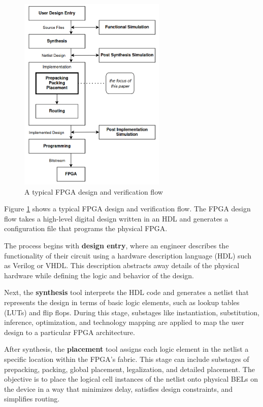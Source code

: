 \documentclass[twocolumn]{article}
\begin{document}
    \begin{figure}
        \centering
        \includegraphics[width=7.0cm]{figures/design_flow.png}
        \caption{A typical FPGA design and verification flow}
        \label{fig:design_flow}
    \end{figure}

    Figure \ref{fig:design_flow} shows a typical FPGA design and verification flow.
    The FPGA design flow takes a high-level digital design written in an HDL and generates a configuration file that programs the physical FPGA. 

    The process begins with \textbf{design entry}, where an engineer describes the functionality of their circuit using a hardware description language (HDL) such as Verilog or VHDL. This description abstracts away details of the physical hardware while defining the logic and behavior of the design.

    Next, the \textbf{synthesis} tool interprets the HDL code and generates a netlist that represents the design in terms of basic logic elements, such as lookup tables (LUTs) and flip flops. 
    During this stage, substages like instantiation, substitution, inference, optimization, and technology mapping are applied to map the user design to a particular FPGA architecture.

    After synthesis, the \textbf{placement} tool assigns each logic element in the netlist a specific location within the FPGA’s fabric. 
    This stage can include substages of prepacking, packing, global placement, legalization, and detailed placement. 
    The objective is to place the logical cell instances of the netlist onto physical BELs on the device in a way that minimizes delay, satisfies design constraints, and simplifies routing. 
\end{document}
